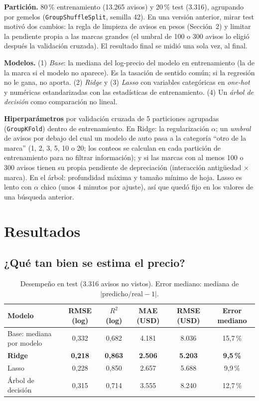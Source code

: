 \documentclass[11pt,a4paper]{article}
\begin{document}
\textbf{Partición.} 80\,\% entrenamiento (13.265 avisos) y 20\,\% test (3.316), agrupando por gemelos
(\texttt{GroupShuffleSplit}, semilla 42). En una versión anterior, mirar test motivó dos cambios: la
regla de limpieza de avisos en pesos (Sección~2) y limitar la pendiente propia a las marcas grandes (el
umbral de 100 o 300 avisos lo eligió después la validación cruzada). El resultado final se midió una
sola vez, al final.

\textbf{Modelos.}
(1) \emph{Base}: la mediana del log-precio del modelo en entrenamiento (la de la marca si el modelo no
aparece). Es la tasación de sentido común; si la regresión no le gana, no aporta.
(2) \emph{Ridge} y (3) \emph{Lasso} con variables categóricas en \emph{one-hot} y numéricas
estandarizadas con las estadísticas de entrenamiento.
(4) Un \emph{árbol de decisión} como comparación no lineal.

\textbf{Hiperparámetros} por validación cruzada de 5 particiones agrupadas (\texttt{GroupKFold}) dentro
de entrenamiento. En Ridge: la regularización $\alpha$; un \emph{umbral} de avisos por debajo del cual un
modelo de auto pasa a la categoría ``otro de la marca'' (1, 2, 3, 5, 10 o 20; los conteos se calculan
en cada partición de entrenamiento para no filtrar información); y si las marcas con al menos 100 o 300
avisos tienen su propia pendiente de depreciación (interacción antigüedad $\times$ marca). En el árbol:
profundidad máxima y tamaño mínimo de hoja. Lasso es lento con $\alpha$ chico (unos 4 minutos por ajuste),
así que quedó fijo en los valores de una búsqueda anterior.

\section{Resultados}

\subsection{¿Qué tan bien se estima el precio?}

\begin{table}[h]
\centering\small
\begin{tabular}{lccccc}
\toprule
Modelo & RMSE (log) & $R^2$ (log) & MAE (USD) & RMSE (USD) & Error mediano \\
\midrule
Base: mediana por modelo & 0,332 & 0,682 & 4.181 & 8.036 & 15,7\,\% \\
\textbf{Ridge}           & \textbf{0,218} & \textbf{0,863} & \textbf{2.506} & \textbf{5.203} & \textbf{9,5\,\%} \\
Lasso                    & 0,228 & 0,850 & 2.657 & 5.688 & 9,9\,\% \\
Árbol de decisión        & 0,315 & 0,714 & 3.555 & 8.240 & 12,7\,\% \\
\bottomrule
\end{tabular}
\caption{Desempeño en test (3.316 avisos no vistos). Error mediano: mediana de
$|\text{predicho}/\text{real} - 1|$.}
\label{tab:resultados}
\end{table}
\end{document}
